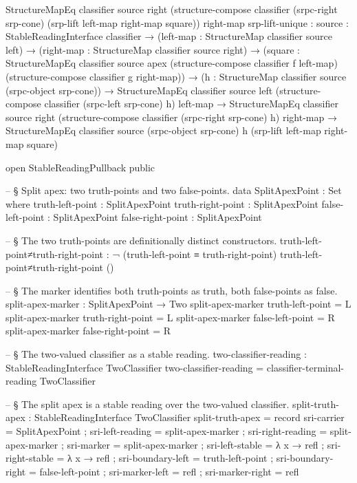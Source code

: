 \documentclass[11pt]{article}
\begin{document}
\begin{code}
                     StructureMapEq classifier source right
                       (structure-compose classifier (srpc-right srp-cone)
                         (srp-lift left-map right-map square))
                       right-map
    srp-lift-unique : {source : StableReadingInterface classifier} →
                      (left-map : StructureMap classifier source left) →
                      (right-map : StructureMap classifier source right) →
                      (square : StructureMapEq classifier source apex
                        (structure-compose classifier f left-map)
                        (structure-compose classifier g right-map)) →
                      (h : StructureMap classifier source (srpc-object srp-cone)) →
                      StructureMapEq classifier source left
                        (structure-compose classifier (srpc-left srp-cone) h)
                        left-map →
                      StructureMapEq classifier source right
                        (structure-compose classifier (srpc-right srp-cone) h)
                        right-map →
                      StructureMapEq classifier source (srpc-object srp-cone) h
                        (srp-lift left-map right-map square)

open StableReadingPullback public

-- § Split apex: two truth-points and two false-points.
data SplitApexPoint : Set where
  truth-left-point  : SplitApexPoint
  truth-right-point : SplitApexPoint
  false-left-point  : SplitApexPoint
  false-right-point : SplitApexPoint

-- § The two truth-points are definitionally distinct constructors.
truth-left-point≠truth-right-point : ¬ (truth-left-point ≡ truth-right-point)
truth-left-point≠truth-right-point ()

-- § The marker identifies both truth-points as truth, both false-points as false.
split-apex-marker : SplitApexPoint → Two
split-apex-marker truth-left-point  = L
split-apex-marker truth-right-point = L
split-apex-marker false-left-point  = R
split-apex-marker false-right-point = R

-- § The two-valued classifier as a stable reading.
two-classifier-reading : StableReadingInterface TwoClassifier
two-classifier-reading = classifier-terminal-reading TwoClassifier

-- § The split apex is a stable reading over the two-valued classifier.
split-truth-apex : StableReadingInterface TwoClassifier
split-truth-apex = record
  { sri-carrier        = SplitApexPoint
  ; sri-left-reading   = split-apex-marker
  ; sri-right-reading  = split-apex-marker
  ; sri-marker         = split-apex-marker
  ; sri-left-stable    = λ x → refl
  ; sri-right-stable   = λ x → refl
  ; sri-boundary-left  = truth-left-point
  ; sri-boundary-right = false-left-point
  ; sri-marker-left    = refl
  ; sri-marker-right   = refl
  }


\end{code}
\end{document}

